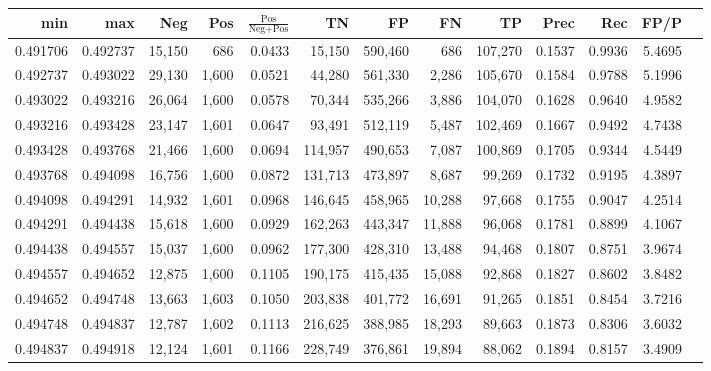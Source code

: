 \begin{tabular}{rrrrrrrrrrrrr}
\toprule
     min &      max &    Neg &   Pos & $\frac{\text{Pos}}{\text{Neg}+\text{Pos}}$ &      TN &      FP &      FN &      TP &   Prec &    Rec &   FP/P \\
\midrule
0.491706 & 0.492737 & 15,150 &   686 &                                     0.0433 &  15,150 & 590,460 &     686 & 107,270 & 0.1537 & 0.9936 & 5.4695 \\
0.492737 & 0.493022 & 29,130 & 1,600 &                                     0.0521 &  44,280 & 561,330 &   2,286 & 105,670 & 0.1584 & 0.9788 & 5.1996 \\
0.493022 & 0.493216 & 26,064 & 1,600 &                                     0.0578 &  70,344 & 535,266 &   3,886 & 104,070 & 0.1628 & 0.9640 & 4.9582 \\
0.493216 & 0.493428 & 23,147 & 1,601 &                                     0.0647 &  93,491 & 512,119 &   5,487 & 102,469 & 0.1667 & 0.9492 & 4.7438 \\
0.493428 & 0.493768 & 21,466 & 1,600 &                                     0.0694 & 114,957 & 490,653 &   7,087 & 100,869 & 0.1705 & 0.9344 & 4.5449 \\
0.493768 & 0.494098 & 16,756 & 1,600 &                                     0.0872 & 131,713 & 473,897 &   8,687 &  99,269 & 0.1732 & 0.9195 & 4.3897 \\
0.494098 & 0.494291 & 14,932 & 1,601 &                                     0.0968 & 146,645 & 458,965 &  10,288 &  97,668 & 0.1755 & 0.9047 & 4.2514 \\
0.494291 & 0.494438 & 15,618 & 1,600 &                                     0.0929 & 162,263 & 443,347 &  11,888 &  96,068 & 0.1781 & 0.8899 & 4.1067 \\
0.494438 & 0.494557 & 15,037 & 1,600 &                                     0.0962 & 177,300 & 428,310 &  13,488 &  94,468 & 0.1807 & 0.8751 & 3.9674 \\
0.494557 & 0.494652 & 12,875 & 1,600 &                                     0.1105 & 190,175 & 415,435 &  15,088 &  92,868 & 0.1827 & 0.8602 & 3.8482 \\
0.494652 & 0.494748 & 13,663 & 1,603 &                                     0.1050 & 203,838 & 401,772 &  16,691 &  91,265 & 0.1851 & 0.8454 & 3.7216 \\
0.494748 & 0.494837 & 12,787 & 1,602 &                                     0.1113 & 216,625 & 388,985 &  18,293 &  89,663 & 0.1873 & 0.8306 & 3.6032 \\
0.494837 & 0.494918 & 12,124 & 1,601 &                                     0.1166 & 228,749 & 376,861 &  19,894 &  88,062 & 0.1894 & 0.8157 & 3.4909 \\

\end{tabular}
